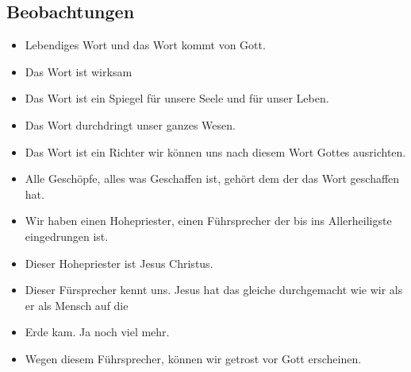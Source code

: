 \subsection{Beobachtungen}
\begin{itemize}
    \item Lebendiges Wort und das Wort kommt von Gott.
    \item Das Wort ist wirksam
    \item Das Wort ist ein Spiegel für unsere Seele und für unser Leben.
    \item Das Wort durchdringt unser ganzes Wesen.
    \item Das Wort ist ein Richter wir können uns nach diesem Wort Gottes ausrichten.
    \item Alle Geschöpfe, alles was Geschaffen ist, gehört dem der das Wort geschaffen hat.
    \item Wir haben einen Hohepriester, einen Führsprecher der bis ins Allerheiligste eingedrungen ist.
    \item Dieser Hohepriester ist Jesus Christus.
    \item Dieser Fürsprecher kennt uns. Jesus hat das gleiche durchgemacht wie wir als er als Mensch auf die \item Erde kam. Ja noch viel mehr.
\item Wegen diesem Führsprecher, können wir getrost vor Gott erscheinen.
\end{itemize}

